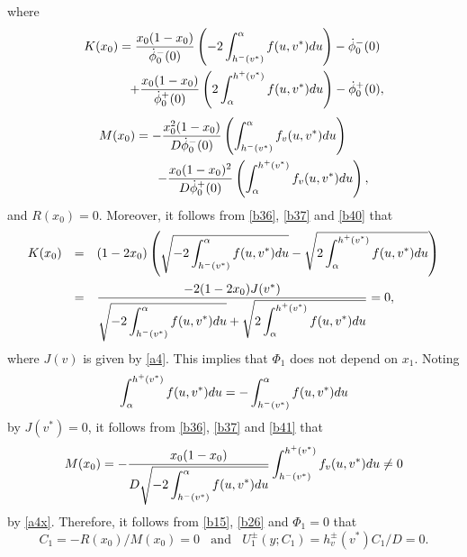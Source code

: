 \documentclass[a4,10pt]{article}
\begin{document}
%
where
%
\begin{equation}\label{b40}
\begin{array}{l}
K(x_0) = \dis\frac{x_0(1-x_0)}{\dot{\phi}^-_0(0)}
\left( -2 \dis\int_{h^-(v^*)}^\alpha f(u, v^* ) du \right) - \dot{\phi}^-_0(0)
\\[3ex]
\ \ \ \ \ \ \ \ \ \ \ 
+ \dis\frac{x_0(1-x_0)}{\dot{\phi}^+_0(0)}
\left( 2 \dis\int_\alpha^{h^+(v^*)} f(u, v^* ) du \right) - \dot{\phi}^+_0(0),
\end{array}
\end{equation}
%
\begin{equation}\label{b41}
\begin{array}{l}
M(x_0) = - \dis\frac{x_0^2(1-x_0)}{D\dot{\phi}^-_0(0)}
\left(  \dis\int_{h^-(v^*)}^\alpha f_v(u, v^* ) du \right) 
\\[3ex]
\ \ \ \  \ \ \ \ \ \ \ \ \ \ 
- \dis\frac{x_0(1-x_0)^2}{D\dot{\phi}^+_0(0)}
\left( \dis\int_\alpha^{h^+(v^*)} f_v(u, v^* ) du \right),
\end{array}
\end{equation}
%
and $R(x_0) = 0$. Moreover, it follows from \eqref{b36}, \eqref{b37} and 
\eqref{b40} that
%
\[%
\begin{array}{rcl}
K(x_0) & = & (1-2x_0) \left( \sqrt{ -2 \dis\int_{h^-(v^*)}^\alpha f(u, v^* ) du } 
- \sqrt{ 2 \dis\int_\alpha^{h^+(v^*)} f(u, v^* ) du } \right)
\\[4ex]
& = & \dis\frac{ -2(1-2x_0) J(v^*)}{ \sqrt{ -2 \dis\int_{h^-(v^*)}^\alpha f(u, v^* ) du }
+ \sqrt{ 2 \dis\int_\alpha^{h^+(v^*)} f(u, v^* ) du } } = 0,
\end{array}
\]%
%
where $J(v)$ is given by \eqref{a4}. 
This implies that $\Phi_1$ does not depend on $x_1$.
Noting
%
\[
\displaystyle\int_\alpha^{h^+(v^*)} f(u, v^* ) du = - \displaystyle\int_{h^-(v^*)}^\alpha f(u, v^* ) du
\]
%
by $J(v^*) = 0$, 
it follows from \eqref{b36}, \eqref{b37} and 
\eqref{b41} that
%
\[%
M(x_0)  = 
- \dis\frac{x_0(1-x_0)}{D  \sqrt{ -2 \dis\int_{h^-(v^*)}^\alpha f(u, v^* ) du } }
\dis\int_{h^-(v^*)}^{h^+(v^*)} f_v(u, v^* ) du \neq 0 
\]%
%
by \eqref{a4x}. Therefore, it follows from \eqref{b15}, \eqref{b26} and $\Phi_1 = 0$
that 
%
\begin{equation}\label{b43x}
C_1 = -R(x_0)/M(x_0) = 0 \ \ \ \ \text{and} \ \ \ \  U^{\pm}_1(y;C_1) = h_v^{\pm}(v^*)C_1/D = 0.
\end{equation}
%
\end{document}
